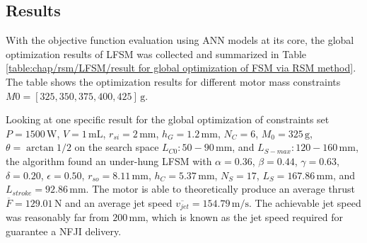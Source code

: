                 
                
                
                    

        \subsection{Results}                   \label{Chapter:RSM/LFSM/Results}        
                
            With the objective function evaluation using \acs{ANN} models at its core, the global optimization results of \acs{LFSM} was collected and summarized in Table\,\ref{table:chap/rsm/LFSM/result for global optimization of FSM via RSM method}. The table shows the optimization results for different motor mass constraints $M0 = [325, 350, 375, 400, 425]\,\mathrm{g}$.
            
            
            Looking at one specific result for the global optimization of constraints set $P=1500\,\mathrm{W}$, $V=1\,\mathrm{mL}$, $r_{si}=2\,\mathrm{mm}$, $h_G=1.2\,\mathrm{mm}$, $N_C=6$, $M_0=325\,\mathrm{g}$, $\theta = \arctan{1/2}$ on the search space $L_{C0}:50-90\,\mathrm{mm}$, and $L_{S-max}:120-160\,\mathrm{mm}$, the algorithm found an under-hung \acs{LFSM} with $\alpha=0.36$, $\beta=0.44$, $\gamma=0.63$, $\delta=0.20$, $\epsilon=0.50$, $r_{so}=8.11\,\mathrm{mm}$, $h_C=5.37\,\mathrm{mm}$, $N_S=17$, $L_S=167.86\,\mathrm{mm}$, and $L_{stroke}=92.86\,\mathrm{mm}$. The motor is able to theoretically produce an average thrust $\overline{F} = 129.01\,\mathrm{N}$ and an average jet speed $\overline{v_{jet}}=154.79\,\mathrm{m/s}$. The achievable jet speed was reasonably far from $200\,\mathrm{mm}$, which is known as the jet speed required for guarantee a \acs{NFJI} delivery. 
            
